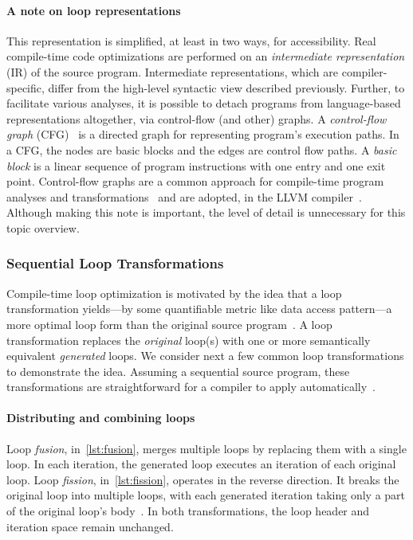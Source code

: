 \paragraph*{A note on loop representations}
This representation is simplified, at least in two ways, for accessibility.
Real compile-time code optimizations are performed
on an \emph{intermediate representation} (IR) of the source program.
Intermediate representations, which are compiler-specific, differ from the high-level syntactic view described previously.
Further, to facilitate various analyses, it is possible to {detach} programs from language-based representations altogether,
via control-flow (and other) graphs.
A \emph{control-flow graph} (CFG)~\cite{allen1970} is a directed graph for representing program's execution paths.
In a CFG, the nodes are {basic blocks} and the edges are control flow paths.
A \emph{basic block} is a linear sequence of program instructions with one entry and one exit point.
Control-flow graphs
are a common approach for compile-time program analyses and transformations~\cite[p. 48]{moyen2017}
and are adopted, \eg in the LLVM compiler~\cite{llvm_loops}.
Although making this note is important, the level of detail is unnecessary for this topic overview.

\subsubsection{Sequential Loop Transformations}
\label{loop-transforms}

Compile-time loop optimization is motivated by the idea that a loop {transformation} yields---by some quantifiable metric like data access pattern---a more optimal loop form than the original source program~\cite{alfred2007}.
A loop transformation replaces the \emph{original} loop(s) with one or more semantically equivalent \emph{generated} loops.
We consider next a few common loop transformations to demonstrate the idea.
Assuming a sequential source program, these transformations are straightforward for a compiler to apply automatically~\cite{bertolacci2018}.

\paragraph*{Distributing and combining loops}
Loop \emph{fusion}, in~\autoref{lst:fusion}, merges multiple loops by replacing them with a single loop.
In each iteration, the generated loop executes an iteration of each original loop.
Loop \emph{fission}, in~\autoref{lst:fission}, operates in the reverse direction.
It breaks the original loop into multiple loops, with each generated iteration taking only a part of the original loop's body~\cite{zhao2018}.
In both transformations, the loop header and iteration space remain unchanged.

